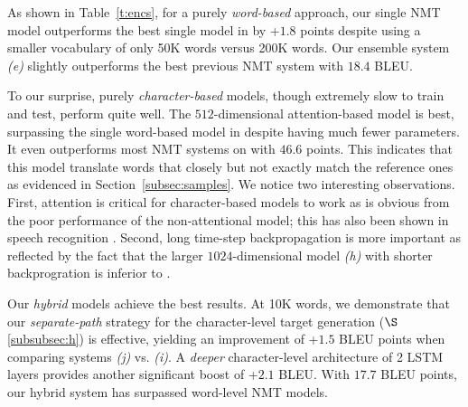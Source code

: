 As shown in Table~\ref{t:encs}, for a purely {\it word-based} approach, 
our single NMT model outperforms the best single model in \cite{jean15wmt} by
+$1.8$ points despite
using a smaller vocabulary of only 50K words versus 200K words. 
Our ensemble system {\it (e)} slightly outperforms the best previous NMT system with $18.4$ BLEU.

To our surprise, purely {\it character-based} models, though extremely slow to
train and test, perform quite well. The $512$-dimensional attention-based model \modelchar{} is
best, surpassing the single word-based model in
\cite{jean15wmt} despite having much fewer parameters. It even outperforms most NMT
systems  
on \chr{} with $46.6$ points. This indicates that this model translate words that closely but
not exactly match the reference ones as evidenced in
Section~\ref{subsec:samples}. 
We notice two interesting observations. First,
attention is critical for character-based models to work as is obvious from the
poor performance of the non-attentional model; this has also been shown in speech
recognition \cite{chan16}. Second, long time-step backpropagation is more important
as reflected by the fact that the larger $1024$-dimensional model {\it (h)} with shorter
backprogration is inferior to \modelchar{}. 



Our {\it hybrid} models achieve the best results. 
At 10K words, we demonstrate that our {\it
separate-path} strategy for the character-level target generation
($\S$\ref{subsubsec:h}) is effective, yielding an improvement of +$1.5$ BLEU
points when comparing systems {\it (j)} vs. {\it (i)}. A {\it deeper} character-level architecture of 2 LSTM
layers provides another significant
boost of +$2.1$ BLEU. %
With $17.7$ BLEU points, our hybrid system \modelsmall{} has
surpassed word-level NMT models.

